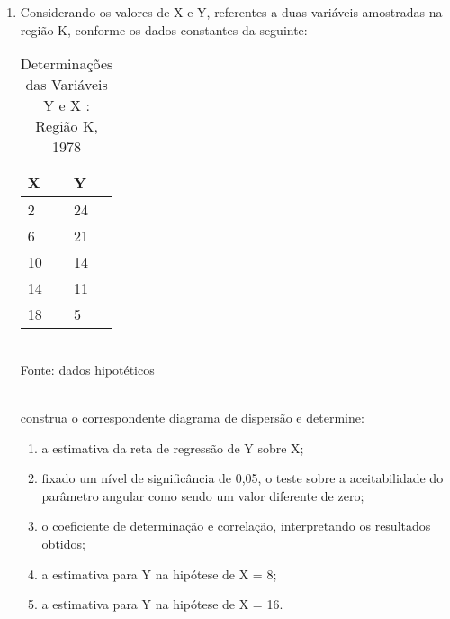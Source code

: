 \begin{enumerate}[resume]
\item Considerando os valores de X e Y, referentes a duas variáveis amostradas na região K, conforme os dados constantes da seguinte:
	\begin{table}[!htb]
	\centering
	\caption{Determinações das Variáveis Y e X : Região K, 1978}
	\vspace{0.5cm}
	\begin{tabular}{ll}
	X & Y \\
	\hline 
	2 & 24  \\
	6 & 21  \\
	10 & 14 \\
	14 & 11  \\
	18 & 5  \\
	\end{tabular}\\
	Fonte: dados hipotéticos\\
	\end{table}\\	
	construa o correspondente diagrama de dispersão e determine:
	\begin{enumerate}
	\item a estimativa da reta de regressão de Y sobre X;
	\item fixado um nível de significância de 0,05, o teste sobre a aceitabilidade do parâmetro angular como sendo um valor diferente de zero;
	\item o coeficiente de determinação e correlação, interpretando os resultados obtidos;
	\item	a estimativa para Y na hipótese de X = 8;
	\item	a estimativa para Y na hipótese de X = 16.
	\end{enumerate}
	

\end{enumerate}
